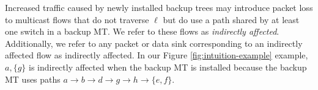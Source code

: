 Increased traffic caused by newly installed backup trees may introduce packet loss to multicast flows that do not traverse $\ell$ but do use a path shared by at
least one switch in a backup MT.  
We refer to these flows as \emph{indirectly affected}. Additionally, we refer to any packet or data sink corresponding to an indirectly affected flow as indirectly affected.
In our Figure \ref{fig:intuition-example} example, $a,\{g\}$ is indirectly affected when the backup MT is installed because the backup MT uses paths 
$a \rightarrow b \rightarrow d \rightarrow g \rightarrow h \rightarrow \{e,f\}$. 












